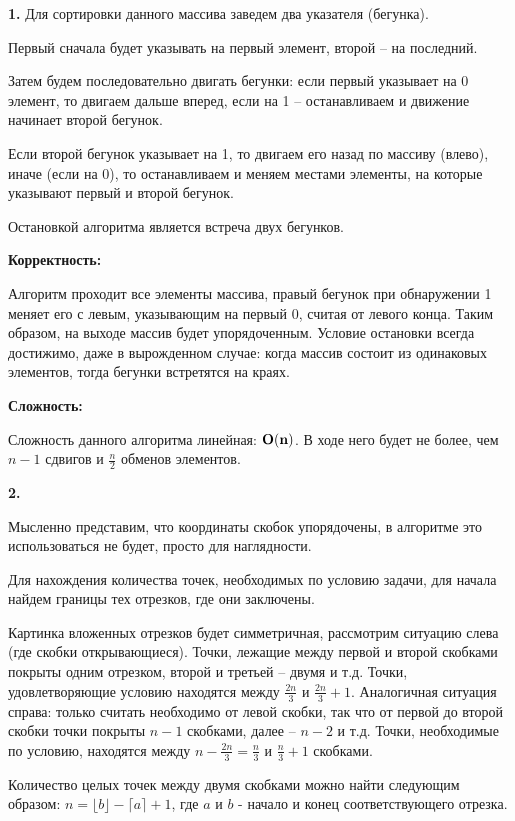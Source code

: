 \documentclass[12pt]{extreport}
\begin{document}
{\bf 1.} Для сортировки данного массива заведем два указателя (бегунка). 

Первый сначала будет указывать на первый элемент, второй -- на последний.

Затем будем последовательно двигать бегунки: если первый указывает на 0 элемент, то двигаем дальше вперед, если на 1 -- останавливаем и движение начинает второй бегунок. 

Если второй бегунок указывает на 1, то двигаем его назад по массиву (влево), иначе (если на 0), то останавливаем и меняем местами элементы, на которые указывают первый и второй бегунок. 

Остановкой алгоритма является встреча двух бегунков.

\bigskip 

{\bf Корректность:}

Алгоритм проходит все элементы массива, правый бегунок при обнаружении 1 меняет его с левым, указывающим на первый 0, считая от левого конца. Таким образом, на выходе массив будет упорядоченным. Условие остановки всегда достижимо, даже в вырожденном случае: когда массив состоит из одинаковых элементов, тогда бегунки встретятся на краях. 

\bigskip

{\bf Сложность:} 

Сложность данного алгоритма линейная: $\bf{O(n)}$. В ходе него будет не более, чем $n-1$ сдвигов и $\frac{n}{2}$ обменов элементов. 


\bigskip 

{\bf 2.} 

Мысленно представим, что координаты скобок упорядочены, в алгоритме это использоваться не будет, просто для наглядности. 

Для нахождения количества точек, необходимых по условию задачи, для начала найдем границы тех отрезков, где они заключены. 

Картинка вложенных отрезков будет симметричная, рассмотрим ситуацию слева (где скобки открывающиеся). Точки, лежащие между первой и второй скобками покрыты одним отрезком, второй и третьей -- двумя и т.д. Точки, удовлетворяющие условию находятся между $\frac{2n}{3}$ и $\frac{2n}{3} + 1$. Аналогичная ситуация справа: только считать необходимо от левой скобки, так что от первой до второй скобки точки покрыты $n-1$ скобками, далее -- $n-2$ и т.д. Точки, необходимые по условию, находятся между $n-\frac{2n}{3} = \frac{n}{3}$ и  $\frac{n}{3} + 1$ скобками. 

Количество целых точек между двумя скобками можно найти следующим образом: $n = \lfloor b \rfloor - \lceil a \rceil + 1$, где $a$ и $b$ - начало и конец соответствующего отрезка. 
\end{document}
